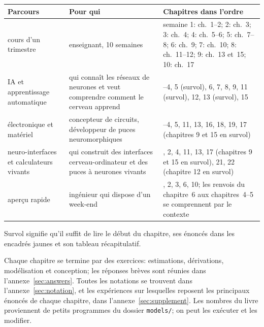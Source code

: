 \begin{center}
\footnotesize
\setlength{\tabcolsep}{4pt}
\renewcommand{\arraystretch}{1.2}
\begin{tabular}{>{\raggedright}p{3.0cm}>{\raggedright}p{3.9cm}>{\raggedright\arraybackslash}p{6.4cm}}
\toprule
Parcours & Pour qui & Chapitres dans l'ordre \\
\midrule
cours d'un trimestre & enseignant, 10 semaines & semaine 1: ch.~1--2; 2: ch.~3; 3: ch.~4; 4: ch.~5--6; 5: ch.~7--8; 6: ch.~9; 7: ch.~10; 8: ch.~11--12; 9: ch.~13 et~15; 10: ch.~17 \\
IA et apprentissage automatique & qui connaît les réseaux de neurones et veut comprendre comment le cerveau apprend & 1--4, 5 (survol), 6, 7, 8, 9, 11 (survol), 12, 13 (survol), 15 \\
électronique et matériel & concepteur de circuits, développeur de puces neuromorphiques & 1--4, 5, 11, 13, 16, 18, 19, 17 (chapitres 9 et 15 en survol) \\
neuro-interfaces et calculateurs vivants & qui construit des interfaces cerveau-ordinateur et des puces à neurones vivants & 1, 2, 4, 11, 13, 17 (chapitres 9 et 15 en survol), 21, 22 (chapitre 12 en survol) \\
aperçu rapide & ingénieur qui dispose d'un week-end & 1, 2, 3, 6, 10; les renvois du chapitre~6 aux chapitres~4--5 se comprennent par le contexte \\
\bottomrule
\end{tabular}
\end{center}

\og Survol\fg{} signifie qu'il suffit de lire le début du chapitre, ses énoncés dans les encadrés jaunes et son tableau récapitulatif.

Chaque chapitre se termine par des exercices: estimations, dérivations, modélisation et conception; les réponses brèves sont réunies dans l'annexe~\ref{sec:answers}. Toutes les notations se trouvent dans l'annexe~\ref{sec:notation}, et les expériences sur lesquelles reposent les principaux énoncés de chaque chapitre, dans l'annexe~\ref{sec:supplement}. Les nombres du livre proviennent de petits programmes du dossier \texttt{models/}; on peut les exécuter et les modifier.
